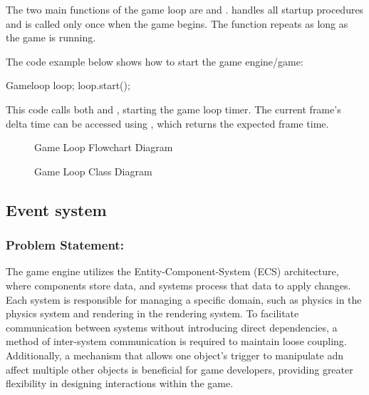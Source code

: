 \documentclass{projdoc}
\begin{document}
The two main functions of the game loop are  and .  handles all startup procedures and is called only once when the game begins. The  function repeats as long as the game is running.

The code example below shows how to start the game engine/game:
\begin{blockcode}
	Gameloop loop;
	loop.start();
\end{blockcode}
This code calls both  and , starting the game loop timer. The current frame’s delta time can be accessed using , which returns the expected frame time.

\begin{figure}
	\centering
	\caption{Game Loop Flowchart Diagram} \label{gameloop-flow}
\end{figure}

\begin{figure}
	\centering
	\caption{Game Loop Class Diagram} \label{gameloop-class}
\end{figure}

\subsection{Event system}
\subsubsection{Problem Statement:}
The game engine utilizes the Entity-Component-System (ECS) architecture, where components store data,
and systems process that data to apply changes. Each system is responsible for managing a specific domain,
such as physics in the physics system and rendering in the rendering system.
To facilitate communication between systems without introducing direct dependencies,
a method of inter-system communication is required to maintain loose coupling.
Additionally, a mechanism that allows one object's trigger to manipulate adn affect multiple other objects is beneficial for game developers, providing greater flexibility in designing interactions within the game.
\end{document}
